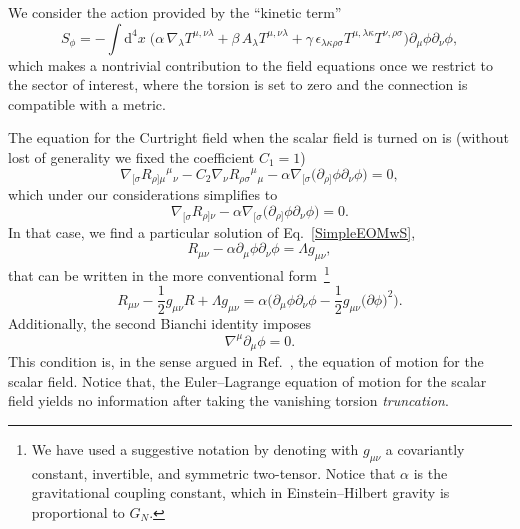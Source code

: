 \documentclass[aps,prd,12pt,twocolumn,superscriptaddress,showpacs,showkeys,reprint%
]{revtex4-1}
\newcommand\pa[1]{\partial_{{#1}}}
\renewcommand{\(}{\left(}
\renewcommand{\)}{\right)}
\renewcommand{\[}{\left[}
\renewcommand{\]}{\right]}
\newcommand{\dn}[2]{{\mathrm{d}}^{#1}{#2}\;}
\newcommand{\hl}[1]{{\color{red} \bfseries{#1}}}
\begin{document}
We consider the action provided by the ``kinetic term''
\begin{dmath}
  \label{ScalarAction}
  S_\phi = -  \int \dn{4}{x} \Big( \alpha \, \nabla_\lambda T^{\mu,\nu\lambda}  + \beta \, A_\lambda T^{\mu,\nu\lambda} + \gamma \, \epsilon_{\lambda\kappa\rho\sigma} T^{\mu, \lambda\kappa} T^{\nu, \rho\sigma} \Big) \partial_\mu\phi\partial_\nu\phi,
\end{dmath}
which makes a nontrivial contribution to the field equations once we restrict to the sector of interest, where the torsion is set to zero and the connection is compatible with a metric.

The equation for the Curtright field when the scalar field is turned on is (without lost of generality we fixed the coefficient $C_1 = 1$)
\begin{equation*}
  \nabla_{[\sigma} R_{\rho]\mu}{}^{\mu}{}_\nu - {C_2} \nabla_\nu  R_{\rho\sigma}{}^{\mu}{}_\mu - \alpha \nabla_{[\sigma} \Big( \partial_{\rho]}\phi \partial_\nu\phi \Big) = 0,
\end{equation*}
which under our considerations simplifies to 
\begin{equation}
  \nabla_{[\sigma} R_{\rho]\nu} - \alpha \nabla_{[\sigma} \Big( \partial_{\rho]}\phi \partial_\nu\phi \Big) = 0.
  \label{SimpleEOMwS}
\end{equation}
In that case, we find a particular solution of Eq.~\eqref{SimpleEOMwS},%
\begin{equation*}
  R_{\mu\nu} - \alpha \pa{\mu} \phi \pa{\nu} \phi = \Lambda g_{\mu\nu},
\end{equation*}
that can be written in the more conventional form~\footnote{We have used a suggestive notation by denoting with $g_{\mu\nu}$ a covariantly constant, invertible, and symmetric two-tensor. Notice that $\alpha$ is the gravitational coupling constant, which in Einstein--Hilbert gravity is proportional to $G_N$.}
\begin{equation}
  R_{\mu\nu} - \frac{1}{2} g_{\mu\nu} R + \Lambda g_{\mu\nu} = \alpha \Big( \pa{\mu} \phi \pa{\nu} \phi - \frac{1}{2} g_{\mu\nu} \big( \partial\phi \big)^2 \Big).
\end{equation}
Additionally, the second Bianchi identity imposes
\begin{equation}
  \nabla^\mu \pa{\mu} \phi = 0.
\end{equation}
This condition is, in the sense argued in Ref.~\cite{Bekenstein:2014uwa}, the equation of motion for the scalar field. Notice that, the Euler--Lagrange equation of motion for the scalar field yields no information after taking the vanishing torsion \emph{truncation}.
\end{document}
